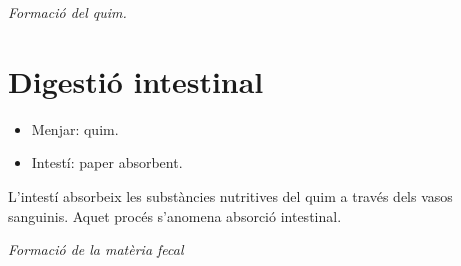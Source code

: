 \begin{news}
	\emph{Formació del quim.}



\section{Digestió intestinal}

	\begin{itemize}
		\item Menjar: quim.
		\item Intestí: paper absorbent.
	\end{itemize}

L’intestí absorbeix les substàncies nutritives del quim a través dels vasos sanguinis. Aquet procés s’anomena absorció intestinal.

	\emph{Formació de la matèria fecal}

\end{news}
